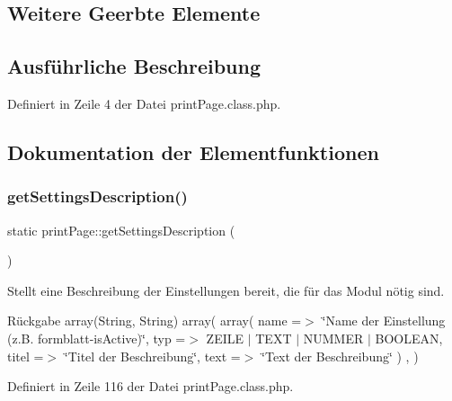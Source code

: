 \subsection*{Weitere Geerbte Elemente}


\subsection{Ausführliche Beschreibung}


Definiert in Zeile 4 der Datei print\+Page.\+class.\+php.



\subsection{Dokumentation der Elementfunktionen}
\mbox{\label{classprint_page_a26953bccc34e77bcfe16cd2c7d7b53d4}} 
\subsubsection{\texorpdfstring{get\+Settings\+Description()}{getSettingsDescription()}}
{\footnotesize\ttfamily static print\+Page\+::get\+Settings\+Description (\begin{DoxyParamCaption}{ }\end{DoxyParamCaption})\hspace{0.3cm}{\ttfamily [static]}}

Stellt eine Beschreibung der Einstellungen bereit, die für das Modul nötig sind. \begin{DoxyReturn}{Rückgabe}
array(\+String, String) array( array( \textquotesingle{}name\textquotesingle{} =$>$ \char`\"{}\+Name der Einstellung (z.\+B. formblatt-\/is\+Active)\char`\"{}, \textquotesingle{}typ\textquotesingle{} =$>$ Z\+E\+I\+LE $\vert$ T\+E\+XT $\vert$ N\+U\+M\+M\+ER $\vert$ B\+O\+O\+L\+E\+AN, \textquotesingle{}titel\textquotesingle{} =$>$ \char`\"{}\+Titel der Beschreibung\char`\"{}, \textquotesingle{}text\textquotesingle{} =$>$ \char`\"{}\+Text der Beschreibung\char`\"{} ) , ) 
\end{DoxyReturn}


Definiert in Zeile 116 der Datei print\+Page.\+class.\+php.

\mbox{\label{classprint_page_a7a84a19cc837708cf19996b58b86136f}} 
